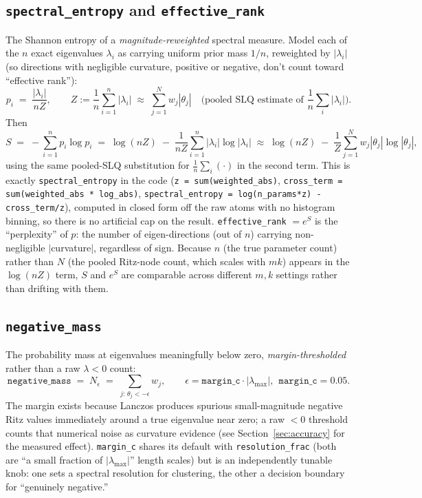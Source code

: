 \documentclass[11pt]{article}
\newcommand{\code}[1]{\texttt{#1}}
\begin{document}
\subsection{\code{spectral_entropy} and \code{effective_rank}}
The Shannon entropy of a \emph{magnitude-reweighted} spectral measure. Model
each of the \(n\) exact eigenvalues \(\lambda_i\) as carrying uniform prior
mass \(1/n\), reweighted by \(|\lambda_i|\) (so directions with negligible
curvature, positive or negative, don't count toward ``effective rank''):
\[
p_i \;=\; \frac{|\lambda_i|}{n Z}, \qquad
Z := \frac1n\sum_{i=1}^n |\lambda_i| \;\approx\; \sum_{j=1}^N w_j |\theta_j|
\quad\text{(pooled SLQ estimate of } \textstyle\frac1n\sum_i|\lambda_i|\text{)}.
\]
Then
\[
S \;=\; -\sum_{i=1}^n p_i \log p_i
\;=\; \log(nZ) \;-\; \frac{1}{nZ}\sum_{i=1}^n |\lambda_i|\log|\lambda_i|
\;\approx\; \log(nZ) \;-\; \frac{1}{Z}\sum_{j=1}^N w_j |\theta_j| \log|\theta_j|,
\]
using the same pooled-SLQ substitution for \(\frac1n\sum_i(\cdot)\) in the
second term. This is exactly \code{spectral_entropy} in the code
(\code{z = sum(weighted_abs)}, \code{cross_term = sum(weighted_abs *
log_abs)}, \code{spectral_entropy = log(n_params*z) - cross_term/z}),
computed in closed form off the raw atoms with no histogram binning, so
there is no artificial cap on the result. \code{effective_rank} \(=
e^S\) is the ``perplexity'' of \(p\): the number of eigen-directions
(out of \(n\)) carrying non-negligible \(|\)curvature\(|\), regardless of
sign. Because \(n\) (the true parameter count) rather than \(N\) (the
pooled Ritz-node count, which scales with \(mk\)) appears in the \(\log(nZ)\)
term, \(S\) and \(e^S\) are comparable across different \(m,k\) settings
rather than drifting with them.

\subsection{\code{negative_mass}}
The probability mass at eigenvalues meaningfully below zero,
\emph{margin-thresholded} rather than a raw \(\lambda<0\) count:
\[
\code{negative_mass} \;=\; N_\epsilon \;=\; \sum_{j:\, \theta_j < -\epsilon} w_j,
\qquad \epsilon = \code{margin_c}\cdot|\lambda_{\max}|,\ \ \code{margin_c}=0.05.
\]
The margin exists because Lanczos produces spurious small-magnitude
negative Ritz values immediately around a true eigenvalue near zero; a raw
\(<0\) threshold counts that numerical noise as curvature evidence (see
Section~\ref{sec:accuracy} for the measured effect). \code{margin_c} shares
its default with \code{resolution_frac} (both are ``a small fraction of
\(|\lambda_{\max}|\)'' length scales) but is an independently tunable knob:
one sets a spectral resolution for clustering, the other a decision
boundary for ``genuinely negative.''
\end{document}
